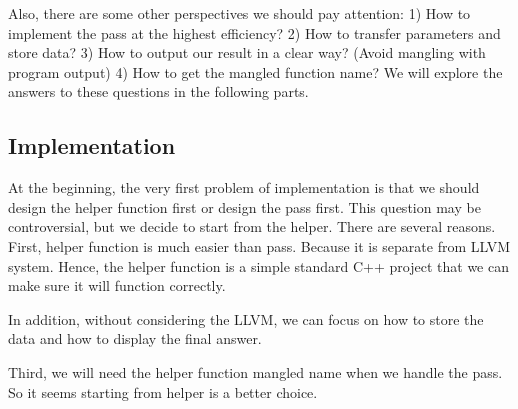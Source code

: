 \documentclass{acm_proc_article-sp}
\begin{document}
Also, there are some other perspectives we should pay attention: 1) How to implement the pass at the highest efficiency? 2) How to transfer parameters and store data? 3) How to output our result in a clear way? (Avoid mangling with program output) 4) How to get the mangled function name? We will explore the answers to these questions in the following parts.

\subsection{Implementation}
At the beginning, the very first problem of implementation is that we should design the helper function first or design the pass first. This question may be controversial, but we decide to start from the helper. There are several reasons. 
First, helper function is much easier than pass. Because it is separate from LLVM system. Hence, the helper function is a simple standard C++ project that we can make sure it will function correctly. 

In addition, without considering the LLVM, we can focus on how to store the data and how to display the final answer.

Third, we will need the helper function mangled name when we handle the pass. So it seems starting from helper is a better choice.
\end{document}
